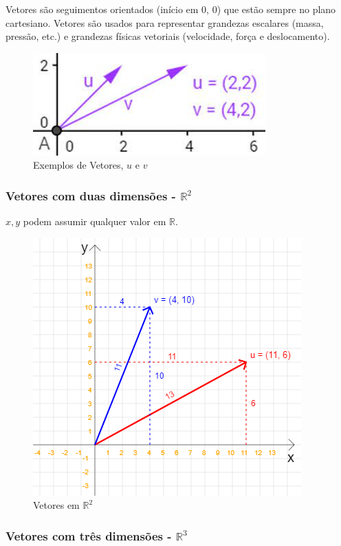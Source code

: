 \documentclass[12pt]{article}
\begin{document}
Vetores são seguimentos orientados (início em 0, 0) que estão sempre no plano cartesiano. Vetores são usados para representar grandezas escalares (massa, pressão, etc.) e grandezas físicas vetoriais (velocidade, força e deslocamento).

\begin{figure}[H]
	\centering
	\includegraphics[width=.5\linewidth]{figuras/vetores_01}
	\caption[Vetores \textbf{u} e \textbf{v}]{Exemplos de Vetores, \(u\) e \(v\)}
	\label{fig:vetores01}
\end{figure}

\subsubsection{Vetores com duas dimensões - \(\mathbb{R}^2\)}

\(x, y\) podem assumir qualquer valor em \(\mathbb{R}\).

\begin{figure}[H]
	\centering
	\includegraphics[height=.45\textheight]{figuras/vetores_02}
	\caption[Vetores em \( \mathbf{R}^{2} \)]{Vetores em \(\mathbb{R}^2\)}
	\label{fig:vetores02}
\end{figure}

\newpage

\subsubsection{Vetores com três dimensões -  \(\mathbb{R}^3\)}
\end{document}
